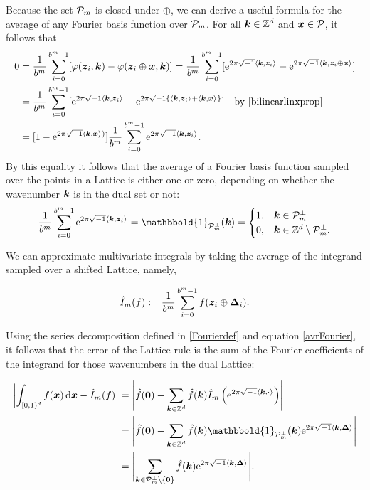 \documentclass[graybox,footinfo]{svmult}
\newcommand{\Z}{\mathbb{Z}} %
\newcommand{\bszero}{\boldsymbol{0}} %
\newcommand{\bsx}{\boldsymbol{x}}    %
\newcommand{\bsz}{\boldsymbol{z}}    %
\newcommand{\bsDelta}{\boldsymbol{\Delta}}    %
\newcommand{\ind}{\mathbbold{1}}
\begin{document}
Because the set $\mathcal{P}_m$ is closed under $\oplus$, we can derive a useful formula for the average of any Fourier basis function over $\mathcal{P}_m$. For all $\bsk \in \Z^d$ and $\bsx \in \cp$, it follows that
\begin{align*}
\nonumber
0 & = \frac{1}{b^m} \sum_{i=0}^{b^m-1} [\varphi(\bsz_i,\bsk) - \varphi(\bsz_i \oplus \bsx,\bsk)]
= \frac{1}{b^m} \sum_{i=0}^{b^m-1} [\me^{2 \pi \sqrt{-1} \ip{\bsk}{\bsz_i}} - \me^{2 \pi \sqrt{-1} \ip{\bsk}{\bsz_i \oplus \bsx}}]\\
\nonumber
& = \frac{1}{b^m} \sum_{i=0}^{b^m-1} [\me^{2 \pi \sqrt{-1} \ip{\bsk}{\bsz_i}} - \me^{2 \pi \sqrt{-1} \{\ip{\bsk}{\bsz_i}+\ip{\bsk}{\bsx}\}}] \quad \text{by } \eqref{bilinearlinxprop}\\
\label{sumeq}
& = [1 - \me^{2 \pi \sqrt{-1} \ip{\bsk}{\bsx})}] \frac{1}{b^m} \sum_{i=0}^{b^m-1}  \me^{2 \pi \sqrt{-1} \ip{\bsk}{\bsz_i}}.
\end{align*}
By this equality it follows that the average of a Fourier basis function sampled over the points in a Lattice is either one or zero, depending on whether the wavenumber $\boldsymbol{k}$ is in the dual set or not:
\begin{equation}\label{avrFourier}
\frac{1}{b^m} \sum_{i=0}^{b^m-1}  \me^{2 \pi \sqrt{-1} \ip{\bsk}{\bsz_i}} = \ind_{\cp_m^{\perp}}(\bsk) = \begin{cases} 1 , & \bsk \in \cp_m^{\perp}\\
 0,  & \bsk \in \Z^d \setminus \cp_m^{\perp}.
 \end{cases}
\end{equation}

We can approximate multivariate integrals by taking the average of the integrand sampled over a shifted Lattice, namely,

\begin{equation} \label{cubaturedef}
\hI_m(f) := \frac{1}{b^m} \sum_{i=0}^{b^m-1} f(\bsz_i \oplus\bsDelta_i).
\end{equation}

Using the series decomposition defined in \eqref{Fourierdef} and equation \eqref{avrFourier}, it follows that the error of the Lattice rule is the sum of the Fourier coefficients of the integrand for those wavenumbers in the dual Lattice:

\begin{align}
\nonumber
\biggabs{ \int_{\cube} f(\bsx) \, \D \bsx - \hI_m(f)} 
& = \Biggabs {\hf(\bszero) - \sum_{\bsk \in \Z^d} \hf(\bsk) \hI_m\left(\E^{2 \pi \sqrt{-1} \ip{\bsk}{\cdot}}\right)} \\
\nonumber
& = \Biggabs {\hf(\bszero) - \sum_{\bsk \in \Z^d} \hf(\bsk) \ind_{\cp_m^{\perp}}(\bsk) \E^{2 \pi \sqrt{-1} \ip{\bsk}{\bsDelta}}} \\ 
& = \Biggabs {\sum_{\bsk \in \cp_m^{\perp}\setminus \{\bszero\} } \hf(\bsk) \E^{2 \pi \sqrt{-1} \ip{\bsk}{\bsDelta}}}. \label{err1}
\end{align}
\end{document}
